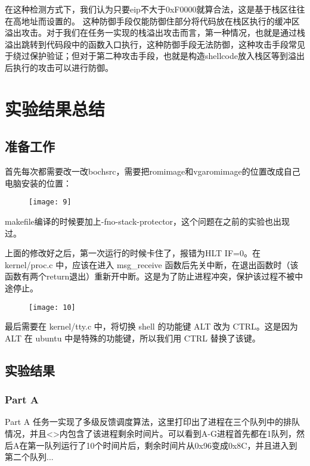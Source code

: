 \documentclass{whureport}
\begin{document}
在这种检测方式下，我们认为只要eip不大于0xF0000就算合法，这是基于栈区往往在高地址而设置的。
这种防御手段仅能防御住部分将代码放在栈区执行的缓冲区溢出攻击。对于我们在任务一实现的栈溢出攻击而言，第一种情况，也就是通过栈溢出跳转到代码段中的函数入口执行，这种防御手段无法防御，这种攻击手段常见于绕过保护验证；但对于第二种攻击手段，也就是构造shellcode放入栈区等到溢出后执行的攻击可以进行防御。


\section{实验结果总结}

\subsection{准备工作}
首先每次都需要改一改bochsrc，需要把romimage和vgaromimage的位置改成自己电脑安装的位置：
\begin{figure}[H]
\centering
\texttt{[image: 9]}
\end{figure}


makefile编译的时候要加上-fno-stack-protector，这个问题在之前的实验也出现过。

上面的修改好之后，第一次运行的时候卡住了，报错为HLT IF=0。在 kernel/proc.c 中，应该在进入 msg\_receive 函数后先关中断，在退出函数时（该函数有两个return退出）重新开中断。这是为了防止进程冲突，保护该过程不被中途停止。

\begin{figure}[H]
\centering
\texttt{[image: 10]}
\end{figure}

最后需要在 kernel/tty.c 中，将切换 shell 的功能键 ALT 改为 CTRL。这是因为
ALT 在 ubuntu 中是特殊的功能键，所以我们用 CTRL 替换了该键。

\subsection{实验结果}

\subsubsection{Part A}
Part A 任务一实现了多级反馈调度算法，这里打印出了进程在三个队列中的排队情况，并且<>内包含了该进程剩余时间片。可以看到A-G进程首先都在1队列，然后A在第一队列运行了10个时间片后，剩余时间片从0x96变成0x8C，并且进入到第二个队列...
\end{document}
